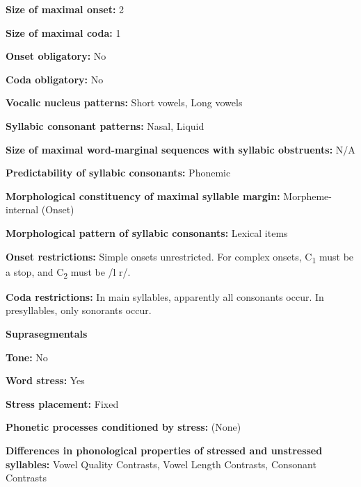 \textbf{Size of maximal onset:} 2



\textbf{Size of maximal coda:} 1



\textbf{Onset obligatory:} No



\textbf{Coda obligatory:} No



\textbf{Vocalic nucleus patterns:} Short vowels, Long vowels



\textbf{Syllabic consonant patterns:} Nasal, Liquid



\textbf{Size of maximal word{}-marginal sequences with syllabic obstruents:} N/A



\textbf{Predictability of syllabic consonants:} Phonemic



\textbf{Morphological constituency of maximal syllable margin:} Morpheme-internal (Onset)



\textbf{Morphological pattern of syllabic consonants:} Lexical items



\textbf{Onset restrictions:} Simple onsets unrestricted. For complex onsets, C\textsubscript{1} must be a stop, and C\textsubscript{2} must be /l r/. 



\textbf{Coda restrictions:} In main syllables, apparently all consonants occur. In presyllables, only sonorants occur.



\textbf{Suprasegmentals}



\textbf{Tone:} No



\textbf{Word stress:} Yes



\textbf{Stress placement:} Fixed



\textbf{Phonetic processes conditioned by stress:} (None)



\textbf{Differences in phonological properties of stressed and unstressed syllables:} Vowel Quality Contrasts, Vowel Length Contrasts, Consonant Contrasts




